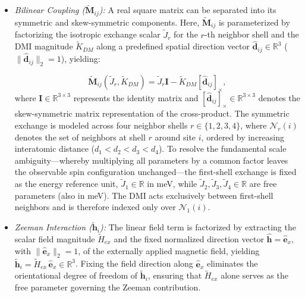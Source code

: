 \documentclass[letterpaper, 12, one column]{article}
\begin{document}
\begin{itemize}

    \item[--] \emph{Bilinear Coupling ($\tilde{\mathbf{M}}_{ij}$):} A 
    real square matrix can be separated into its symmetric and skew-symmetric components. Here, 
    $\tilde{\mathbf{M}}_{ij}$ is parameterized by factorizing the isotropic exchange scalar $\tilde{J}_r$ for the $r$-th neighbor shell and the DMI magnitude $\tilde{K}_{DM}$ along a predefined spatial direction vector $\hat{\mathbf{d}}_{ij} \in \mathbb{R}^3$ 
    ($\|\hat{\mathbf{d}}_{ij}\|_2=1$), yielding:
    
    \begin{equation}\label{eq:MatrixDecomposition}
    \tilde{\mathbf{M}}_{ij}(\tilde{J}_r,\tilde{K}_{DM}) = 
        \tilde{J}_r \mathbf{I} - \tilde{K}_{DM} [\hat{\mathbf{d}}_{ij}]_{\times},
    \end{equation}
    where $\mathbf{I} \in \mathbb{R}^{3 \times 3}$ represents the identity matrix and 
    $[\hat{\mathbf{d}}_{ij}]_{\times} \in \mathbb{R}^{3 \times 3}$ denotes the skew-symmetric matrix representation of the cross-product. The symmetric exchange is modeled across four neighbor shells $r \in \{1,2,3,4\}$, where $\mathcal{N}_r(i)$ denotes the 
    set of neighbors at shell $r$ around site $i$, ordered by 
    increasing interatomic distance ($d_1 < d_2 < d_3 < d_4$). To resolve the fundamental scale ambiguity---whereby multiplying all parameters by a common factor leaves the observable spin configuration unchanged---the first-shell exchange is fixed as the energy reference unit, $\tilde{J}_1\in \mathbb{R}$ in meV, while $\tilde{J}_2, \tilde{J}_3, \tilde{J}_4 \in \mathbb{R}$ are free parameters (also in meV). The DMI acts exclusively between first-shell neighbors and is therefore indexed only over $\mathcal{N}_1(i)$.

    \item[--] \emph{Zeeman Interaction ($\tilde{\mathbf{h}}_i$):} The linear field term is factorized by extracting the scalar field magnitude $\tilde{H}_{ex}$ and the fixed normalized direction vector 
    $\hat{\mathbf{h}} = \hat{\mathbf{e}}_x,$ with 
    $\|\hat{\mathbf{e}}_x\|_2 = 1$, of the externally applied 
    magnetic field, yielding $\tilde{\mathbf{h}}_i = \tilde{H}_{ex}\,\hat{\mathbf{e}}_x\in\mathbb{R}^3$. Fixing the field direction along $\hat{\mathbf{e}}_x$ eliminates the orientational degree of freedom of $\tilde{\mathbf{h}}_i$, ensuring that $\tilde{H}_{ex}$ alone serves as the free parameter governing the Zeeman 
    contribution.


\end{itemize}
\end{document}
